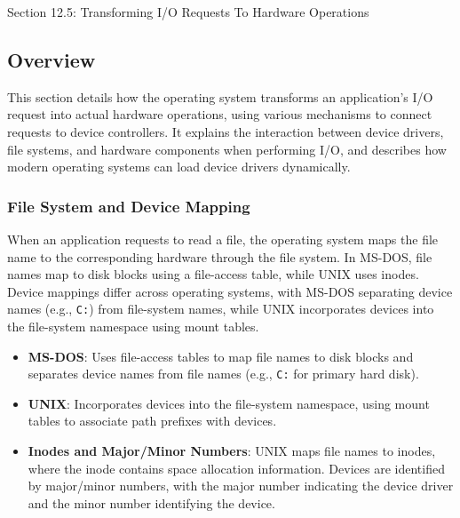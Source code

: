 \begin{notes}{Section 12.5: Transforming I/O Requests To Hardware Operations}
    \subsection*{Overview}

    This section details how the operating system transforms an application's I/O request into actual hardware operations, using various mechanisms to connect requests to device controllers. It explains 
    the interaction between device drivers, file systems, and hardware components when performing I/O, and describes how modern operating systems can load device drivers dynamically.
    
    \subsubsection*{File System and Device Mapping}
    
    When an application requests to read a file, the operating system maps the file name to the corresponding hardware through the file system. In MS-DOS, file names map to disk blocks using a file-access 
    table, while UNIX uses inodes. Device mappings differ across operating systems, with MS-DOS separating device names (e.g., \texttt{C:}) from file-system names, while UNIX incorporates devices into the 
    file-system namespace using mount tables.
    
    \begin{highlight}
    
        \begin{itemize}
            \item \textbf{MS-DOS}: Uses file-access tables to map file names to disk blocks and separates device names from file names (e.g., \texttt{C:} for primary hard disk).
            \item \textbf{UNIX}: Incorporates devices into the file-system namespace, using mount tables to associate path prefixes with devices.
            \item \textbf{Inodes and Major/Minor Numbers}: UNIX maps file names to inodes, where the inode contains space allocation information. Devices are identified by major/minor numbers, with 
            the major number indicating the device driver and the minor number identifying the device.
        \end{itemize}
    
    \end{highlight}
    

\end{notes}
